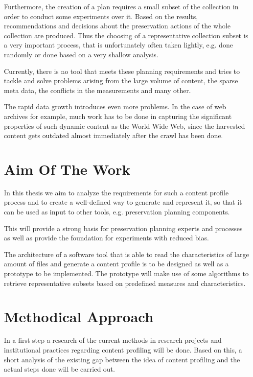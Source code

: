 Furthermore, the creation of a plan requires a small subset of the collection in order to conduct some experiments over it. Based on the results, recommendations and decisions about the preservation actions of the whole collection are produced. Thus the choosing of a representative collection subset is a very important process, that is unfortunately often taken lightly, e.g. done randomly or done based on a very shallow analysis.

Currently, there is no tool that meets these planning requirements and tries to tackle and solve problems arising from the large volume of content, the sparse meta data, the conflicts in the measurements and many other.

The rapid data growth introduces even more problems. In the case of web archives for example, much work has to be done in capturing the significant properties of such dynamic content as the World Wide Web, since the harvested content gets outdated almost immediately after the crawl has been done.


\section{Aim Of The Work}
In this thesis we aim to analyze the requirements for such a content profile process and to create a well-defined way to generate and represent it, so that it can be used as input to other tools, e.g. preservation planning components.

This will provide a strong basis for preservation planning experts and processes as well as provide the foundation for experiments with reduced bias.

The architecture of a software tool that is able to read the characteristics of large amount of files and generate a content profile is to be designed as well as a prototype to be implemented. The prototype will make use of some algorithms to retrieve representative subsets based on predefined measures and characteristics.

\section{Methodical Approach}
In a first step a research of the current methods in research projects and institutional practices regarding content profiling will be done. Based on this, a short analysis of the existing gap between the idea of content profiling and the actual steps done will be carried out. 


